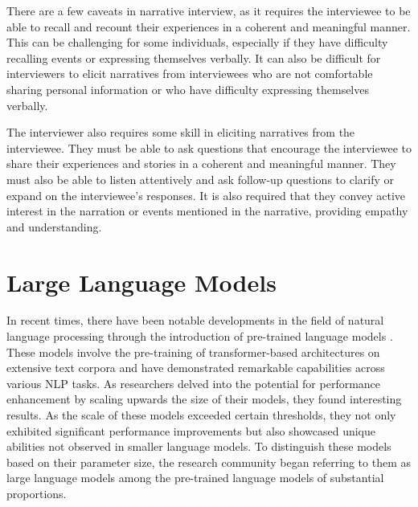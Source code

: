 There are a few caveats in narrative interview, as it requires the interviewee to be able to recall and recount their experiences in a coherent and meaningful manner. This can be challenging for some individuals, especially if they have difficulty recalling events or expressing themselves verbally. It can also be difficult for interviewers to elicit narratives from interviewees who are not comfortable sharing personal information or who have difficulty expressing themselves verbally. \cite{Sammantha2021-na}

The interviewer also requires some skill in eliciting narratives from the interviewee. They must be able to ask questions that encourage the interviewee to share their experiences and stories in a coherent and meaningful manner. They must also be able to listen attentively and ask follow-up questions to clarify or expand on the interviewee's responses. It is also required that they convey active interest in the narration or events mentioned in the narrative, providing empathy and understanding. \cite{Fairbairn2002-xd}
\section{Large Language Models}
In recent times, there have been notable developments in the field of natural language processing through the introduction of pre-trained language models \cite{radford2018improving}. These models involve the pre-training of transformer-based architectures \cite{vaswani2017attention} on extensive text corpora and have demonstrated remarkable capabilities across various NLP tasks. As researchers delved into the potential for performance enhancement by scaling upwards the size of their models, they found interesting results. As the scale of these models exceeded certain thresholds, they not only exhibited significant performance improvements but also showcased unique abilities not observed in smaller language models. To distinguish these models based on their parameter size, the research community began referring to them as large language models among the pre-trained language models of substantial proportions. \cite{zhao2023survey,huang2022towards,wei2022emergent}

